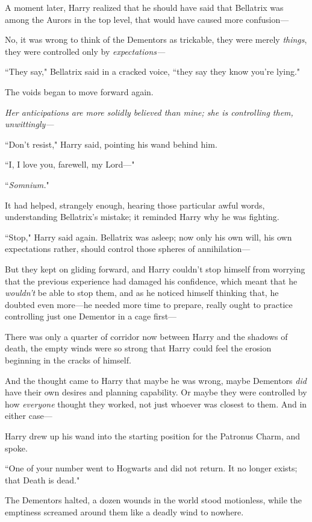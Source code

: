 A moment later, Harry realized that he should have said that Bellatrix was among the Aurors in the top level, that would have caused more confusion—

No, it was wrong to think of the Dementors as trickable, they were merely \emph{things}, they were controlled only by \emph{expectations—}

``They say," Bellatrix said in a cracked voice, ``they say they know you're lying."

The voids began to move forward again.

\emph{Her anticipations are more solidly believed than mine; she is controlling them, unwittingly—}

``Don't resist," Harry said, pointing his wand behind him.

``I, I love you, farewell, my Lord—"

``\emph{Somnium.}"

It had helped, strangely enough, hearing those particular awful words, understanding Bellatrix's mistake; it reminded Harry why he was fighting.

``Stop," Harry said again. Bellatrix was asleep; now only his own will, his own expectations rather, should control those spheres of annihilation—

But they kept on gliding forward, and Harry couldn't stop himself from worrying that the previous experience had damaged his confidence, which meant that he \emph{wouldn't} be able to stop them, and as he noticed himself thinking that, he doubted even more—he needed more time to prepare, really ought to practice controlling just one Dementor in a cage first—

There was only a quarter of corridor now between Harry and the shadows of death, the empty winds were so strong that Harry could feel the erosion beginning in the cracks of himself.

And the thought came to Harry that maybe he was wrong, maybe Dementors \emph{did} have their own desires and planning capability. Or maybe they were controlled by how \emph{everyone} thought they worked, not just whoever was closest to them. And in either case—

Harry drew up his wand into the starting position for the Patronus Charm, and spoke.

``One of your number went to Hogwarts and did not return. It no longer exists; that Death is dead."

The Dementors halted, a dozen wounds in the world stood motionless, while the emptiness screamed around them like a deadly wind to nowhere.

